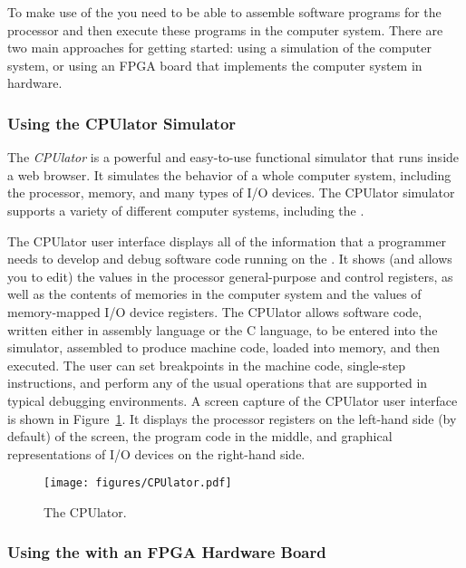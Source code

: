 To make use of the {\it \systemNameFull} you need to be able to assemble software programs 
for the {\processor} processor and then execute these programs in the computer system. There are 
two main approaches for getting started: using a simulation of the computer system, or
using an FPGA board that implements the computer system in hardware.

\subsubsection {Using the CPUlator Simulator}

The {\it CPUlator} is a powerful and easy-to-use functional simulator that runs inside a
web browser. It simulates the behavior of a whole computer system, including the
processor, memory, and many types of I/O devices. The CPUlator simulator supports a variety
of different computer systems, including the {\it \systemNameFull}. 

The CPUlator user interface displays all of the information that a programmer needs to
develop and debug software code running on the {\it \systemNameFull}. It shows (and allows
you to edit) the values in the processor general-purpose and control registers, as well as the 
contents of memories in the computer system and the values of memory-mapped I/O device 
registers. The CPUlator allows software code, written either in assembly language or the 
C language, to be entered into the simulator, assembled to produce machine code, loaded 
into memory, and then executed. The user can set breakpoints in the machine code, 
single-step instructions, and perform any of the usual operations that are supported in 
typical debugging environments. A screen capture of the CPUlator user interface is shown 
in Figure~\ref{fig:CPUlator}. It displays the processor registers on the 
left-hand side (by default) of the screen,
the program code in the middle, and graphical representations of I/O devices on the 
right-hand side.

\begin{figure}[h!]
   \begin{center}
        \texttt{[image: figures/CPUlator.pdf]}
   \end{center}
   \caption{The CPUlator.}
	\label{fig:CPUlator}
\end{figure}

\subsubsection {Using the {\productNameMed{}} with an FPGA Hardware Board}

